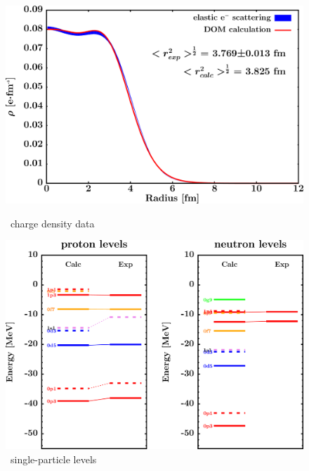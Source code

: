 \begin{figure}[H]
    \centering
    \begin{minipage}{0.45\textwidth}
        \centering
        \includegraphics[width=1.0\textwidth]{figures/ni58_chargeDensity.png}
        \caption{\niEight\ charge density data}
        \label{DOMFitData_ni58_chargeDensity}
    \end{minipage}\hfill
    \begin{minipage}{0.45\textwidth}
        \centering
        \includegraphics[width=1.0\textwidth]{figures/ni58_SPLevels.png}
        \caption{\niEight\ single-particle levels}
        \label{DOMFitData_ni58_SPLevels}
    \end{minipage}
\end{figure}

\afterpage{\clearpage}

